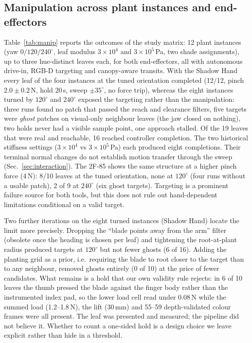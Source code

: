 \documentclass[letterpaper, 10 pt, conference]{ieeeconf}
\begin{document}
\subsection{Manipulation across plant instances and end-effectors}\label{sec:manip}
Table~\ref{tab:manip} reports the outcomes of the study matrix: 12 plant instances (yaw
$0/120/240^\circ$, leaf modulus $3{\times}10^4$ and $3{\times}10^5$\,Pa, two shade
assignments), up to three hue-distinct leaves each, for both end-effectors, all with
autonomous drive-in, RGB-D targeting and canopy-aware transits. With the Shadow Hand every
leaf of the four instances at the tuned orientation completed (12/12, pinch
$2.0{\pm}0.2$\,N, hold 20\,s, sweep $\pm35^\circ$, no force trip), whereas the eight instances
turned by $120^\circ$ and $240^\circ$ exposed the targeting rather than the manipulation:
three runs found no patch that passed the reach and clearance filters, five targets were
\emph{ghost} patches on visual-only neighbour leaves (the jaw closed on nothing), two holds
never had a visible sample point, one approach stalled. Of the 19 leaves that were real and
reachable, 16 reached controller completion. The two historical stiffness settings
($3{\times}10^4$ vs $3{\times}10^5$\,Pa) each produced eight completions. Their terminal
normal changes do not establish motion transfer through the sweep (Sec.~\ref{sec:interaction}).
The 2F-85 shows the same structure at a higher pinch force (4\,N): 8/10 leaves at the tuned
orientation, none at $120^\circ$ (four runs without a usable patch), 2 of 9 at $240^\circ$
(six ghost targets). Targeting is a prominent failure source for both tools, but this
does not rule out hand-dependent limitations conditional on a valid target.

Two further iterations on the eight turned instances (Shadow Hand) locate the limit more
precisely. Dropping the ``blade points away from the arm'' filter (obsolete once the heading
is chosen per leaf) and tightening the root-at-plant radius produced targets at $120^\circ$
but not fewer ghosts (6 of 16). Adding the planting grid as a prior, i.e.\ requiring the blade
to root closer to the target than to any neighbour, removed ghosts entirely (0 of 10) at the
price of fewer candidates. What remains is a hold that our own validity rule rejects: in 6 of
10 leaves the thumb pressed the blade against the finger body rather than the instrumented
index pad, so the lower load cell read under 0.08\,N while the summed load (1.2--1.8\,N),
the lift (30\,mm) and 55--59 depth-validated colour frames were all present. The leaf was
presented and measured; the pipeline did not believe it. Whether to count a one-sided hold
is a design choice we leave explicit rather than hide in a threshold.
\end{document}
